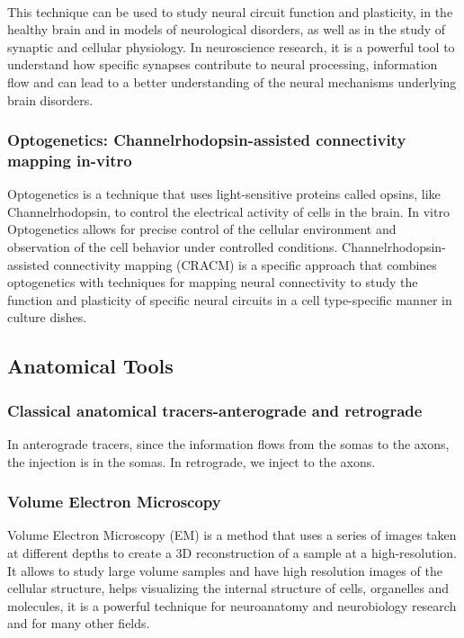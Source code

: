 \begin{itemize}
\begin{itemize}
\\This technique can be used to study neural circuit function and plasticity, in the healthy brain and in models of neurological disorders, as well as in the study of synaptic and cellular physiology. In neuroscience research, it is a powerful tool to understand how specific synapses contribute to neural processing, information flow and can lead to a better understanding of the neural mechanisms underlying brain disorders.

\subsubsection{Optogenetics: Channelrhodopsin-assisted connectivity mapping in-vitro}
Optogenetics is a technique that uses light-sensitive proteins called opsins, like Channelrhodopsin, to control the electrical activity of cells in the brain. In vitro Optogenetics allows for precise control of the cellular environment and observation of the cell behavior under controlled conditions. Channelrhodopsin-assisted connectivity mapping (CRACM) is a specific approach that combines optogenetics with techniques for mapping neural connectivity to study the function and plasticity of specific neural circuits in a cell type-specific manner in culture dishes.
\subsection{Anatomical Tools}
\subsubsection{Classical anatomical tracers-anterograde and retrograde}
In anterograde tracers,  since the information flows from the somas to the axons, the injection is in the somas. In retrograde, we inject to the axons.
\subsubsection{Volume Electron Microscopy}
Volume Electron Microscopy (EM) is a method that uses a series of images taken at different depths to create a 3D reconstruction of a sample at a high-resolution. It allows to study large volume samples and have high resolution images of the cellular structure, helps visualizing the internal structure of cells, organelles and molecules, it is a powerful technique for neuroanatomy and neurobiology research and for many other fields.


\end{itemize}
\end{itemize}

